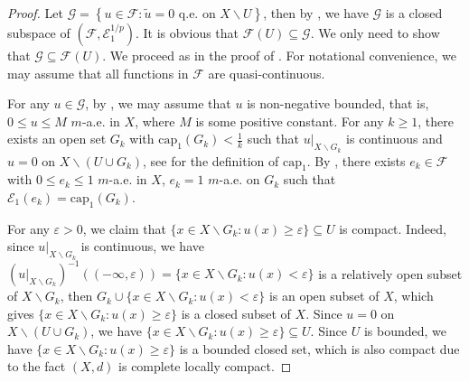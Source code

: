 \documentclass[11pt,a4paper]{article}
\numberwithin{equation}{section}
\theoremstyle{plain}
\theoremstyle{definition}
\begin{document}
\begin{proof}
Let $\mathcal{G}=\left\{u\in\mathcal{F}:\widetilde{u}=0\text{ q.e. on }X\backslash U\right\}$, then by \cite[Corollary 8.7]{Yan25a}, we have $\mathcal{G}$ is a closed subspace of $(\mathcal{F},\mathcal{E}^{1/p}_1)$. It is obvious that $\mathcal{F}(U)\subseteq\mathcal{G}$. We only need to show that $\mathcal{G}\subseteq\mathcal{F}(U)$. We proceed as in the proof of \cite[Lemma 5.43]{BB11}. For notational convenience, we may assume that all functions in $\mathcal{F}$ are quasi-continuous.

For any $u\in\mathcal{G}$, by \cite[Corollary 3.19 (a)]{KS24a}, we may assume that $u$ is non-negative bounded, that is, $0\le u\le M$ $m$-a.e. in $X$, where $M$ is some positive constant. For any $k\ge1$, there exists an open set $G_k$ with $\mathrm{cap}_1(G_k)<\frac{1}{k}$ such that $u|_{X\backslash G_k}$ is continuous and $u=0$ on $X\backslash(U\cup G_k)$, see \cite[Section 8]{Yan25a} for the definition of $\mathrm{cap}_1$. By \cite[Lemma 8.2]{Yan25a}, there exists $e_k\in\mathcal{F}$ with $0\le e_k\le1$ $m$-a.e. in $X$, $e_k=1$ $m$-a.e. on $G_k$ such that $\mathcal{E}_1(e_k)=\mathrm{cap}_1(G_k)$.

For any $\varepsilon>0$, we claim that $\{x\in X\backslash G_k:u(x)\ge\varepsilon\}\subseteq U$ is compact. Indeed, since $u|_{X\backslash G_k}$ is continuous, we have $(u|_{X\backslash G_k})^{-1}((-\infty,\varepsilon))=\{x\in X\backslash G_k:u(x)<\varepsilon\}$ is a relatively open subset of $X\backslash G_k$, then $G_k\cup\{x\in X\backslash G_k:u(x)<\varepsilon\}$ is an open subset of $X$, which gives $\{x\in X\backslash G_k:u(x)\ge\varepsilon\}$ is a closed subset of $X$. Since $u=0$ on $X\backslash(U\cup G_k)$, we have $\{x\in X\backslash G_k:u(x)\ge\varepsilon\}\subseteq U$. Since $U$ is bounded, we have $\{x\in X\backslash G_k:u(x)\ge\varepsilon\}$ is a bounded closed set, which is also compact due to the fact $(X,d)$ is complete locally compact.


\end{proof}
\end{document}
